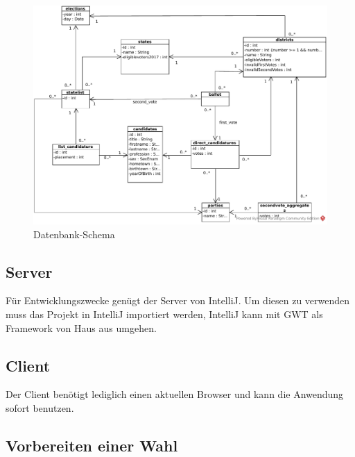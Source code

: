 \documentclass[a4paper]{scrreprt}
\begin{document}
\begin{figure}[H]
\centering
\includegraphics[width=\textwidth]{images/DBS_Schema.pdf}
\caption {Datenbank-Schema}
\end{figure}

\subsection{Server}

Für Entwicklungszwecke genügt der Server von IntelliJ.
Um diesen zu verwenden muss das Projekt in IntelliJ importiert werden, IntelliJ kann mit GWT als Framework von Haus aus umgehen.

\subsection{Client}

Der Client benötigt lediglich einen aktuellen Browser und kann die Anwendung sofort benutzen.

\subsection{Vorbereiten einer Wahl}
\end{document}

